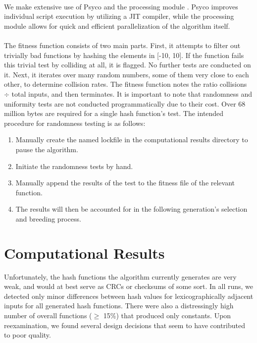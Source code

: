 \documentclass{article}
\begin{document}
\paragraph{}
We make extensive use of Psyco \cite{Psyco} and the processing module \cite{Processing}. Psyco improves individual script execution by utilizing a JIT compiler, while the processing module allows for quick and efficient parallelization of the algorithm itself.

\paragraph{}
The fitness function consists of two main parts. First, it attempts to filter out trivially bad functions by hashing the elements in [-10, 10]. If the function fails this trivial test by colliding at all, it is flagged. No further tests are conducted on it.
Next, it iterates over many random numbers, some of them very close to each other, to determine collision rates.
The fitness function notes the ratio collisions $\div$ total inputs, and then terminates.
It is important to note that randomness and uniformity tests are not conducted programmatically due to their cost. Over 68 million bytes are required for a single hash function's test. The intended procedure for randomness testing is as follows: 
\begin{enumerate}
	\item Manually create the named lockfile in the computational results directory to pause the algorithm.
	\item Initiate the randomness tests by hand.
	\item Manually append the results of the test to the fitness file of the relevant function. 
	\item The results will then be accounted for in the following generation's selection and breeding process.
\end{enumerate}

\section{Computational Results}
Unfortunately, the hash functions the algorithm currently generates are very weak, and would at best serve as CRCs or checksums of some sort. In all runs, we detected only minor differences between hash values for lexicographically adjacent inputs for all generated hash functions.
There were also a distressingly high number of overall functions ($\geq$ 15\%) that produced only constants. Upon reexamination, we found several design decisions that seem to have contributed to poor quality.
\end{document}
